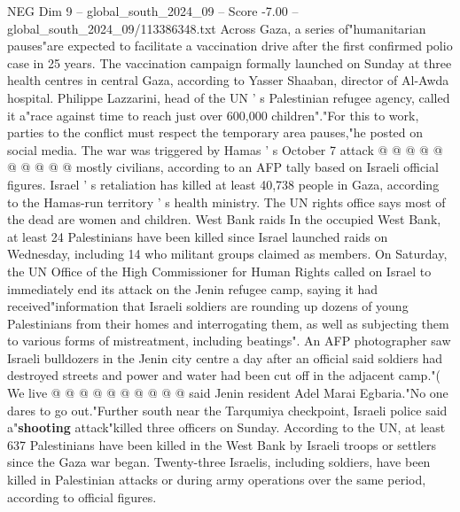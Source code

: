 \begin{textsample}{NEG Dim 9 – global\_south\_2024\_09 – Score -7.00 – global\_south\_2024\_09/113386348.txt}
Across Gaza, a series of"humanitarian pauses"are expected to facilitate a vaccination drive after the first confirmed polio case in 25 years.
The vaccination campaign formally launched on Sunday at three health centres in central Gaza, according to Yasser Shaaban, director of Al-Awda hospital.
Philippe Lazzarini, head of the UN ' s Palestinian refugee agency, called it a"race against time to reach just over 600,000 children"."For this to work, parties to the conflict must respect the temporary area pauses,"he posted on social media.
The war was triggered by Hamas ' s October 7 attack @ @ @ @ @ @ @ @ @ @ mostly civilians, according to an AFP tally based on Israeli official figures.
Israel ' s retaliation has killed at least 40,738 people in Gaza, according to the Hamas-run territory ' s health ministry.
The UN rights office says most of the dead are women and children.
West Bank raids In the occupied West Bank, at least 24 Palestinians have been killed since Israel launched raids on Wednesday, including 14 who militant groups claimed as members.
On Saturday, the UN Office of the High Commissioner for Human Rights called on Israel to immediately end its attack on the Jenin refugee camp, saying it had received"information that Israeli soldiers are rounding up dozens of young Palestinians from their homes and interrogating them, as well as subjecting them to various forms of mistreatment, including beatings".
An AFP photographer saw Israeli bulldozers in the Jenin city centre a day after an official said soldiers had destroyed streets and power and water had been cut off in the adjacent camp."( We live @ @ @ @ @ @ @ @ @ @ said Jenin resident Adel Marai Egbaria."No one dares to go out."Further south near the Tarqumiya checkpoint, Israeli police said a"\textbf{shooting} attack"killed three officers on Sunday.
According to the UN, at least 637 Palestinians have been killed in the West Bank by Israeli troops or settlers since the Gaza war began.
Twenty-three Israelis, including soldiers, have been killed in Palestinian attacks or during army operations over the same period, according to official figures.

\end{textsample}
